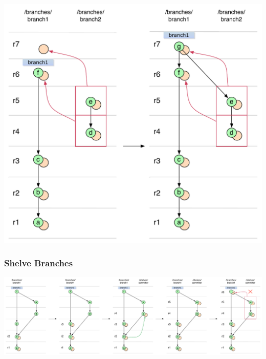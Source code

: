 \begin{center}
\includegraphics[width=\textwidth]{img/diagrams/merge_commit_on_double_cherry_pick_branch_no_parent_svn_to_git.pdf}%
\label{merge_commit_on_double_cherry_pick_branch_no_parent_svn_to_git}%
\end{center}

\subsubsection{Shelve Branches}

\begin{center}
\includegraphics[width=\textwidth]{img/diagrams/boat_merge_git_to_svn.pdf}%
\label{boat_merge_git_to_svn}%
\end{center}

